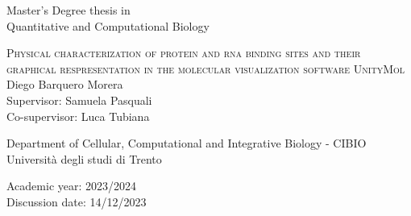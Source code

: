 \pagestyle{empty}
\begin{center}
  \begin{figure}[h!]
    \centerline{}
  \end{figure}
  
  \vspace{1 cm}
  \Large{Master's Degree thesis in\\Quantitative and Computational Biology\\}  
  \vspace{1 cm}

  \LARGE\textsc{Physical characterization of protein and rna binding sites and their graphical respresentation in the molecular visualization software UnityMol\\}
  \vspace{0.5 cm}
  \LARGE{Diego Barquero Morera\\}
  \vspace{0.5 cm}
  \Large{Supervisor: Samuela Pasquali\\}
  \Large{Co-supervisor: Luca Tubiana\\}

  \vspace{2 cm} 
  \Large{Department of Cellular, Computational and Integrative Biology - CIBIO\\}
  \Large{Università degli studi di Trento}
  \vspace{0.5 cm}
  
  \Large{Academic year: 2023/2024}\\
  \Large{Discussion date: 14/12/2023}
\end{center}
\maketitle
